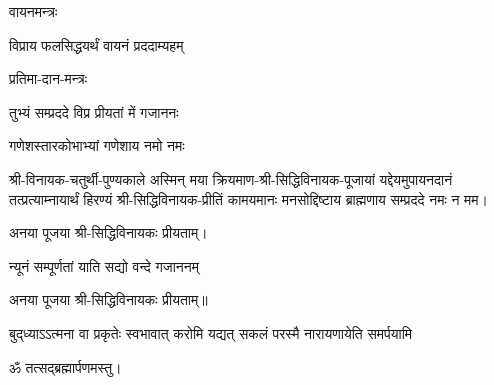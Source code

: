 \begin{center}
\centerline{वायनमन्त्रः}

{विप्राय फलसिद्धयर्थं वायनं प्रददाम्यहम्}

\centerline{प्रतिमा-दान-मन्त्रः}

{तुभ्यं सम्प्रददे विप्र प्रीयतां में गजाननः}

{गणेशस्तारकोभाभ्यां गणेशाय नमो नमः}

\hiranyagarbha

श्री-विनायक-चतुर्थी-पुण्यकाले अस्मिन् मया क्रियमाण-श्री-सिद्धिविनायक-पूजायां
यद्देयमुपायनदानं तत्प्रत्याम्नायार्थं हिरण्यं श्री-सिद्धिविनायक-प्रीतिं
कामयमानः मनसोद्दिष्टाय ब्राह्मणाय सम्प्रददे नमः न मम।

अनया पूजया श्री-सिद्धिविनायकः प्रीयताम्।

\end{center}


    
    
    


{न्यूनं सम्पूर्णतां याति सद्यो वन्दे गजाननम्}

अनया पूजया श्री-सिद्धिविनायकः प्रीयताम्॥

{बुद्‌ध्याऽऽत्मना वा प्रकृतेः स्वभावात्}
{करोमि यद्यत् सकलं परस्मै}
{नारायणायेति समर्पयामि}

\centerline{ॐ तत्सद्ब्रह्मार्पणमस्तु।}

\begin{center}
\end{center}


\begin{center}
\end{center}

\closesection